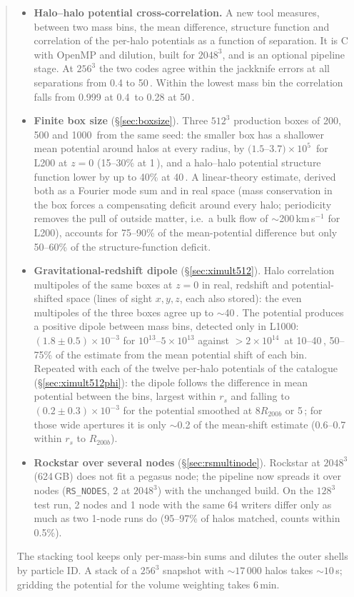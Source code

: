 \begin{abstract}
\begin{itemize}
The outer $\sim$1\% is the mass-weighted mean of the deeper halo cores, not a zero-point offset.
\item \textbf{Halo--halo potential cross-correlation.} A new tool measures, between two mass bins, the mean
difference, structure function and correlation of the per-halo potentials as a function of separation. It is C with
OpenMP and dilution, built for $2048^3$, and is an optional pipeline stage. At $256^3$ the two codes agree within
the jackknife errors at all separations from 0.4 to 50\,\Mpch. Within the lowest mass bin the correlation falls
from 0.999 at 0.4\,\Mpch{} to 0.28 at 50\,\Mpch.
\item \textbf{Finite box size} (\S\ref{sec:boxsize}). Three $512^3$ production boxes of 200, 500 and 1000\,\Mpch{}
from the same seed: the smaller box has a shallower mean potential around halos at every radius, by
$(1.5$--$3.7)\times10^5$\,\kms{} for L200 at $z=0$ (15--30\% at 1\,\Mpch), and a halo--halo potential structure
function lower by up to 40\% at 40\,\Mpch. A linear-theory estimate, derived both as a Fourier mode sum and in real
space (mass conservation in the box forces a compensating deficit around every halo; periodicity removes the pull of
outside matter, i.e.\ a bulk flow of $\sim$200\,km\,s$^{-1}$ for L200), accounts for 75--90\% of the mean-potential
difference but only 50--60\% of the structure-function deficit.
\item \textbf{Gravitational-redshift dipole} (\S\ref{sec:ximult512}). Halo correlation multipoles of the same boxes at
$z=0$ in real, redshift and potential-shifted space (lines of sight $x,y,z$, each also stored): the even multipoles of
the three boxes agree up to $\sim$40\,\Mpch. The potential produces a positive dipole between mass bins, detected only
in L1000: $(1.8\pm0.5)\times10^{-3}$ for $10^{13}$--$5\times10^{13}$ against $>2\times10^{14}$\,\Msunh{} at
10--40\,\Mpch, 50--75\% of the estimate from the mean potential shift of each bin.
Repeated with each of the twelve per-halo potentials of the catalogue (\S\ref{sec:ximult512phi}): the dipole
follows the difference in mean potential between the bins, largest within $r_s$ and falling to
$(0.2\pm0.3)\times10^{-3}$ for the potential smoothed at $8R_{200b}$ or 5\,\Mpch; for those wide apertures it
is only $\sim$0.2 of the mean-shift estimate (0.6--0.7 within $r_s$ to $R_{200b}$).
\item \textbf{Rockstar over several nodes} (\S\ref{sec:rsmultinode}). Rockstar at $2048^3$ (624\,GB) does not fit a
pegasus node; the pipeline now spreads it over nodes (\texttt{RS\_NODES}, 2 at $2048^3$) with the unchanged build. On
the $128^3$ test run, 2 nodes and 1 node with the same 64 writers differ only as much as two 1-node runs do (95--97\%
of halos matched, counts within 0.5\%).
\end{itemize}
The stacking tool keeps only per-mass-bin sums and dilutes the outer shells by particle ID. A stack of a $256^3$
snapshot with $\sim17\,000$ halos takes $\sim10$\,s; gridding the potential for the volume weighting takes 6\,min.
\end{abstract}
